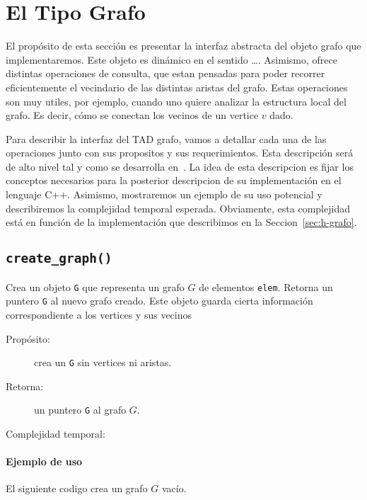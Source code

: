 \documentclass[a4paper,12pt]{article}
\begin{document}
\section{El Tipo Grafo}
\label{sec:tad grafo}

El propósito de esta sección es presentar la interfaz abstracta del objeto grafo que implementaremos.  Este objeto es dinámico en el sentido \ldots.  Asimismo, ofrece distintas operaciones de consulta, que estan pensadas para poder recorrer eficientemente el vecindario de las distintas aristas del grafo.  Estas operaciones son muy utiles, por ejemplo, cuando uno quiere analizar la estructura local del grafo.  Es decir, cómo se conectan los vecinos de un vertice $v$ dado.  

Para describir la interfaz del TAD grafo, vamos a detallar cada una de las operaciones junto con sus propositos y sus requerimientos.  Esta descripción será de alto nivel tal y como se desarrolla en~\cite{}.  La idea de esta descripcion es fijar los conceptos necesarios para la posterior descripcion de su implementación en el lenguaje C++.  Asimismo, mostraremos un ejemplo de su uso potencial y describiremos la complejidad temporal esperada.  Obviamente, esta complejidad está en función de la implementación que describimos en la Seccion~\ref{sec:h-grafo}.  

\subsection{\texttt{create\_graph()}}
\label{sec:tad grafo:create-graph}

Crea un objeto \texttt{G} que representa un grafo $G$ de elementos \texttt{elem}. Retorna un puntero \texttt{G} al nuevo grafo creado. Este objeto guarda cierta información correspondiente a los vertices y sus vecinos

\begin{description}
  \item [Propósito:] crea un \texttt{G} sin vertices ni aristas.
  \item [Retorna:] un puntero \texttt{G} al grafo $G$.
  \item [Complejidad temporal:]
\end{description}

\paragraph{Ejemplo de uso}

El siguiente codigo crea un grafo $G$ vacío.
\end{document}
